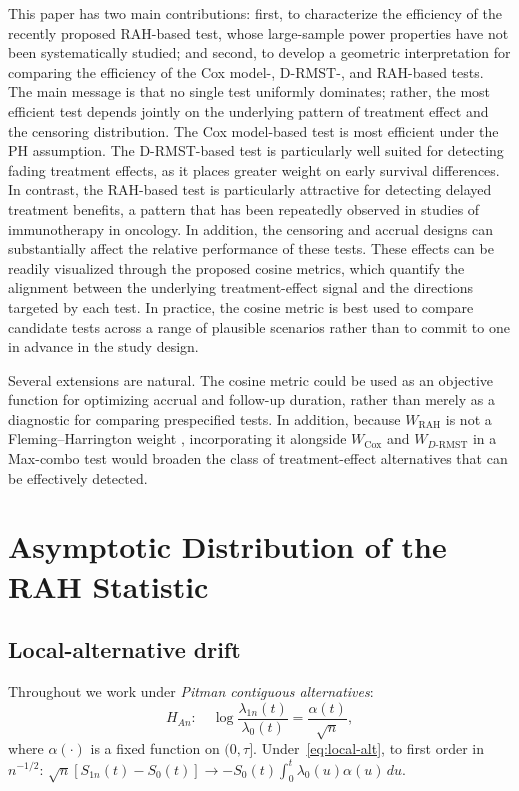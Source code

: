 \documentclass[12pt]{article}
\newcommand{\RAH}{\mathrm{RAH}}
\newcommand{\DRMST}{D\text{-}\mathrm{RMST}}
\newcommand{\dd}{\,d}
\begin{document}
This paper has two main contributions: first, to characterize the efficiency of the recently proposed RAH-based test, whose large-sample power properties have not been systematically studied; and second, to develop a geometric interpretation for comparing the efficiency of the Cox model-, D-RMST-, and RAH-based tests. The main message is that no single test uniformly dominates; rather, the most efficient test depends jointly on the underlying pattern of treatment effect and the censoring distribution. The Cox model-based test is most efficient under the PH assumption. The D-RMST-based test is particularly well suited for detecting fading treatment effects, as it places greater weight on early survival differences. In contrast, the RAH-based test is particularly attractive for detecting delayed treatment benefits, a pattern that has been repeatedly observed in studies of immunotherapy in oncology. In addition, the censoring and accrual designs can substantially affect the relative performance of these tests. These effects can be readily visualized through the proposed cosine metrics, which quantify the alignment between the underlying treatment-effect signal and the directions targeted by each test. In practice, the cosine metric is best used to compare candidate tests across a range of plausible scenarios rather than to commit to one in advance in the study design.








Several extensions are natural. The cosine metric could be used as an objective function for optimizing accrual and follow-up duration, rather than merely as a diagnostic for comparing prespecified tests. In addition, because $W_{\RAH}$ is not a Fleming--Harrington weight \citep{FlemingHarrington1991}, incorporating it alongside $W_{\mathrm{Cox}}$ and $W_{\DRMST}$ in a Max-combo test would broaden the class of treatment-effect alternatives that can be effectively detected.


\appendix

\section{Asymptotic Distribution of the RAH Statistic}
\label{sec:appendix-proofs}

\subsection{Local-alternative drift}
Throughout we work under \emph{Pitman contiguous alternatives}:
\begin{equation}\label{eq:local-alt}
  H_{An}:\quad
  \log\frac{\lambda_{1n}(t)}{\lambda_0(t)}=\frac{\alpha(t)}{\sqrt{n}},
\end{equation}
where $\alpha(\cdot)$ is a fixed function on $(0,\tau]$.
Under~\eqref{eq:local-alt}, to first order in $n^{-1/2}$:
$\sqrt{n}[S_{1n}(t)-S_0(t)]\to-S_0(t)\int_0^t\lambda_0(u)\alpha(u)\dd u$.
\end{document}

